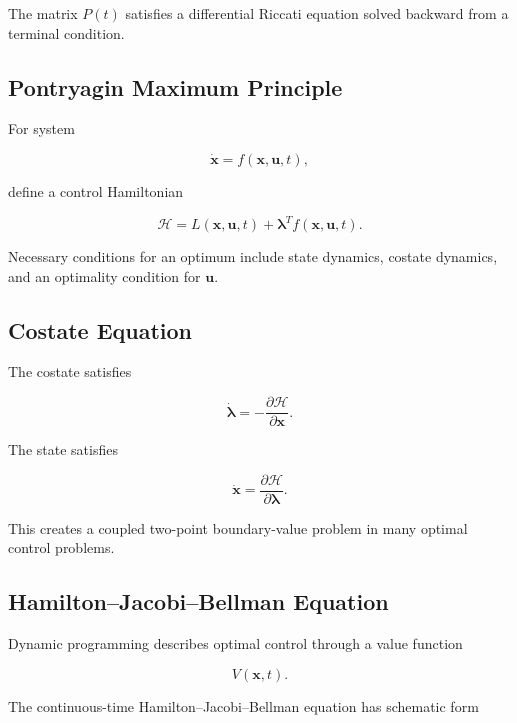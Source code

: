The matrix \(P(t)\) satisfies a differential Riccati equation solved
backward from a terminal condition.

\subsection{Pontryagin Maximum Principle}
\label{subsec:pontryagin-maximum-principle}

For system

\[
\dot{\mathbf{x}}
=
f(\mathbf{x},\mathbf{u},t),
\]

define a control Hamiltonian

\[
\boxed{
\mathcal{H}
=
L(\mathbf{x},\mathbf{u},t)
+
\boldsymbol{\lambda}^{T}
f(\mathbf{x},\mathbf{u},t).
}
\]

Necessary conditions for an optimum include state dynamics, costate
dynamics, and an optimality condition for \(\mathbf{u}\).

\subsection{Costate Equation}
\label{subsec:costate-equation}

The costate satisfies

\[
\boxed{
\dot{\boldsymbol{\lambda}}
=
-
\frac{\partial\mathcal{H}}
{\partial\mathbf{x}}.
}
\]

The state satisfies

\[
\boxed{
\dot{\mathbf{x}}
=
\frac{\partial\mathcal{H}}
{\partial\boldsymbol{\lambda}}.
}
\]

This creates a coupled two-point boundary-value problem in many optimal
control problems.

\subsection{Hamilton--Jacobi--Bellman Equation}
\label{subsec:hjb-control}

Dynamic programming describes optimal control through a value function

\[
V(\mathbf{x},t).
\]

The continuous-time Hamilton--Jacobi--Bellman equation has schematic form

